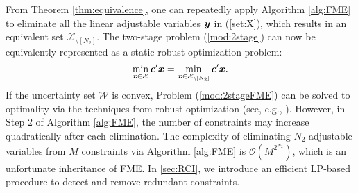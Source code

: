 \documentclass[fleqn,orsc,blindrev]{informs4}
\newcommand{\mb}[1]{\mbox{\boldmath \ensuremath{#1}}}
\begin{document}
	
	From Theorem \ref{thm:equivalence}, one can repeatedly apply Algorithm \ref{alg:FME} to eliminate all the linear adjustable variables $\mb{y}$ in (\ref{set:X}), which results in an equivalent set $\mathcal{X}_{\setminus [N_2]}$. The two-stage  problem (\ref{mod:2stage}) can now be equivalently represented as a static robust optimization problem:
\begin{equation}
		\label{mod:2stageFME}
		\min_{\boldsymbol{x} \in \mathcal{X}} \mb{c}'\mb{x} = \min_{\boldsymbol{x} \in \mathcal{X}_{\setminus [N_2]}} \mb{c}'\mb{x}.
\end{equation}
	If the uncertainty set $\mathcal{W}$ is convex,  Problem (\ref{mod:2stageFME}) can be solved to optimality via the techniques from robust optimization (see, e.g., \cite{mb09,bdv15,gbbd14}).  However, in Step 2 of Algorithm \ref{alg:FME}, the number of constraints may increase quadratically after each elimination. The complexity of eliminating $N_2$ adjustable variables from $M$ constraints via Algorithm \ref{alg:FME} is $\mathcal{O}(M^{2^{N_2}})$, which is an unfortunate inheritance of FME. In \textsection \ref{sec:RCI}, we introduce an efficient LP-based procedure to detect and remove redundant constraints.
	
\end{document}
